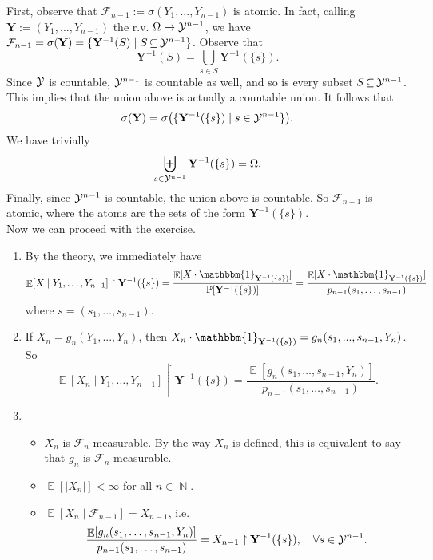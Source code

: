 \documentclass[12pt,a4paper]{report}
\theoremstyle{definition}
\theoremstyle{num.custom-title}
\DeclareMathOperator{\N}{\mathbb{N}}
\DeclareMathOperator{\E}{\mathbb{E}}
\DeclareMathOperator{\sse}{\subseteq}
\newcommand{\F}{\mathcal{F}}
\renewcommand{\P}{\mathbb{P}}
\renewcommand{\1}{\mathbbm{1}}
\begin{document}
First, observe that $\F_{n-1} := \sigma(Y_1,...,Y_{n-1})$ is atomic. In fact, calling $\mathbf{Y} := (Y_1,...,Y_{n-1})$ the r.v. $\Omega \to \mathcal{Y}^{n-1}$, we have $\F_{n-1} = \sigma(\mathbf{Y}) = \{\mathbf{Y}^{-1}(S) \mid S \sse \Y^{n-1} \}$. 
Observe that
\[
\mathbf{Y}^{-1}(S) = \bigcup_{s \in S} \mathbf{Y}^{-1}(\{s\}).
\]
Since $\mathcal{Y}$ is countable, $\mathcal{Y}^{n-1}$ is countable as well, and so is every subset $S \sse \Y^{n-1}$. This implies that the union above is actually a countable union. It follows that
\[
\sigma(\mathbf{Y}) = \sigma \big( \{\mathbf{Y}^{-1}(\{s\}) \mid s \in \mathcal{Y}^{n-1} \} \big).
\] 
We have trivially 
\[
\biguplus_{s \in \mathcal{Y}^{n-1}} \mathbf{Y}^{-1}(\{s\}) = \Omega.
\]
Finally, since $\mathcal{Y}^{n-1}$ is countable, the union above is countable. So $\F_{n-1}$ is atomic, where the atoms are the sets of the form $\mathbf{Y}^{-1}(\{s\})$.\\
Now we can proceed with the exercise.
\begin{enumerate}
\item By the theory, we immediately have
\[
\E[X \mid Y_1, \ldots, Y_{n-1}] \upharpoonright \mathbf{Y}^{-1}(\{s\}) =
\frac{\E[X \cdot \1_{\mathbf{Y}^{-1}(\{s\})}]}{\P[\mathbf{Y}^{-1}(\{s\})]}
= \frac{\E[X \cdot \1_{\mathbf{Y}^{-1}(\{s\})}]}{p_{n-1}(s_1,\ldots,s_{n-1})}
\]
where $s = (s_1,...,s_{n-1})$.
\item If $X_n = g_n(Y_1,...,Y_n)$, then $X_n \cdot \1_{\mathbf{Y}^{-1}(\{s\})} = g_n(s_1,...,s_{n-1}, Y_n)$. So
\[
\E[X_n \mid Y_1, \ldots, Y_{n-1}] \upharpoonright \mathbf{Y}^{-1}(\{s\}) =
\frac{\E[g_n(s_1,\ldots,s_{n-1}, Y_n)]}{p_{n-1}(s_1,\ldots,s_{n-1})}.
\]
\item 
\begin{itemize}
\item $X_n$ is $\F_n$-measurable. By the way $X_n$ is defined, this is equivalent to say that $g_n$ is $\F_n$-measurable.
\item $\E[|X_n|] < \infty$ for all $n \in \N$.
\item $\E[X_n \mid \F_{n-1}] = X_{n-1}$, i.e. 
\[
\frac{\E[g_n(s_1,\ldots,s_{n-1}, Y_n)]}{p_{n-1}(s_1,\ldots,s_{n-1})} = X_{n-1} \upharpoonright \mathbf{Y}^{-1}(\{s\}), \quad \forall s \in \Y^{n-1}.
\]
\end{itemize}
\end{enumerate}
\end{document}
